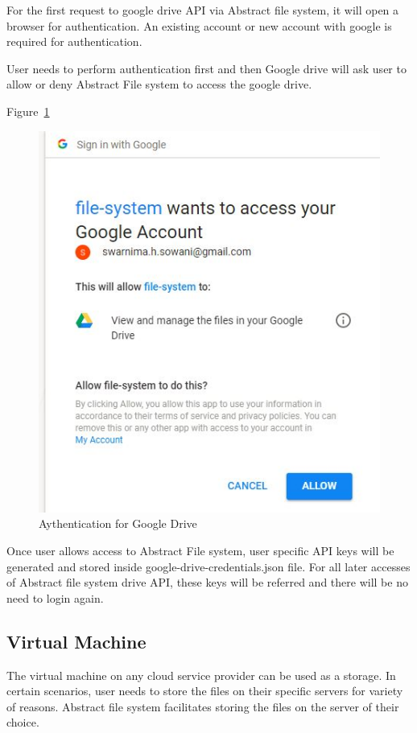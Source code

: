 For the first request to google drive API via Abstract file system, it will 
open a browser for authentication. An existing account or new account with 
google is required for authentication. 

User needs to perform authentication first and then Google drive will ask user 
to allow or deny Abstract File system to access the google drive. 

Figure~\ref{fig:auth}

\begin{figure}[!ht]
        \centering\includegraphics[width=\columnwidth]
        {image/auth.JPG}
        \caption{Aythentication for Google Drive}\label{fig:auth}
\end{figure}


Once user allows access to Abstract File system, user specific API keys will 
be generated and stored inside google-drive-credentials.json file. 
For all later accesses of Abstract file system drive API, these keys will be 
referred and there will be no need to login again. 


\subsection{Virtual Machine}
The virtual machine on any cloud service provider can be used as a storage. In 
certain scenarios, user needs to store the files on their specific servers for 
variety of reasons. Abstract file system facilitates storing the files on the 
server of their choice.

